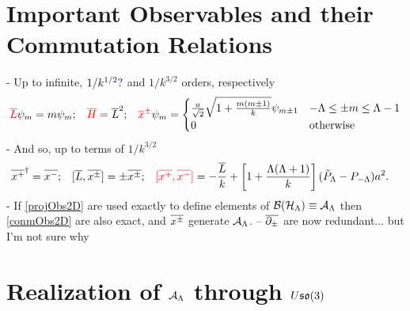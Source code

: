 \linea


\section{Important Observables and their Commutation Relations}

{
    \color{gray}
    
    - Up to infinite, $1/k^{1/2}\textcolor{blue}{?}$ and $1/k^{3/2}$ orders, respectively
    \begin{align}
    \label{projObs2D}
        \textcolor{red}{\overline{L}} \psi_m &= m \psi_m; & 
        \textcolor{red}{\overline{H}} &= \overline{L}^2; & 
        \textcolor{red}{\overline{x}^\pm} \psi_m = 
            \begin{cases}
                \frac{a}{\sqrt{2}} \sqrt{ 1 + \frac{m(m \pm 1)}{k} } \psi_{m \pm 1} & -\Lambda \leq \pm m \leq \Lambda - 1 \\
                0 & \text{otherwise}
            \end{cases}
    \end{align}
    - And so, up to terms of $1/k^{3/2}$
    \begin{align}
        \label{conmObs2D}
        \overline{x^+}^\dagger &= \overline{x^-}; &
        [\overline{L}, \overline{x^\pm}] &= \pm \overline{x^\pm}; &
        \textcolor{red}{[\overline{x^+}, \overline{x^-}]} &= - \frac{\overline{L}}{k} + \left[1 + \frac{\Lambda(\Lambda+1)}{k}\right] (\tilde P_{\Lambda} - P_{-\Lambda})a^2.
    \end{align}
     - If \eqref{projObs2D} are used exactly to define elements of $\mathcal B(\mathcal H_\Lambda) \equiv \mathcal A_\Lambda$ then \eqref{conmObs2D} are also exact, and $\overline{x^\pm}$ generate $\mathcal A_\Lambda$. -- $\overline{\partial_\pm}$ are now redundant... but I'm not sure why
     
}

\linea


\section{Realization of $\mathcal A_\Lambda$ through $U\mathfrak{so}(3)$}

